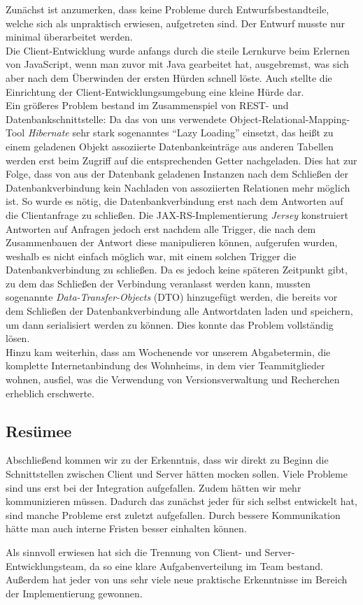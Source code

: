  Zunächst ist anzumerken, dass keine Probleme durch Entwurfsbestandteile, welche sich als unpraktisch erwiesen, aufgetreten sind. Der Entwurf musste nur minimal überarbeitet werden.\\
 Die Client-Entwicklung wurde anfangs durch die steile Lernkurve beim Erlernen von JavaScript, wenn man zuvor mit Java gearbeitet hat, ausgebremst, was sich aber nach dem Überwinden der ersten Hürden schnell löste. Auch stellte die Einrichtung der Client-Entwicklungsumgebung eine kleine Hürde dar.\\
 Ein größeres Problem bestand im Zusammenspiel von REST- und Datenbankschnittstelle: Da das von uns verwendete Object-Relational-Mapping-Tool \textit{Hibernate} sehr stark sogenanntes \enquote{Lazy Loading} einsetzt, das heißt zu einem geladenen Objekt assoziierte Datenbankeinträge aus anderen Tabellen werden erst beim Zugriff auf die entsprechenden Getter nachgeladen. Dies hat zur Folge, dass von aus der Datenbank geladenen Instanzen nach dem Schließen der Datenbankverbindung kein Nachladen von assoziierten Relationen mehr möglich ist. So wurde es nötig, die Datenbankverbindung erst nach dem Antworten auf die Clientanfrage zu schließen. Die JAX-RS-Implementierung \textit{Jersey} konstruiert Antworten auf Anfragen jedoch erst nachdem alle Trigger, die nach dem Zusammenbauen der Antwort diese manipulieren können, aufgerufen wurden, weshalb es nicht einfach möglich war, mit einem solchen Trigger die Datenbankverbindung zu schließen. Da es jedoch keine späteren Zeitpunkt gibt, zu dem das Schließen der Verbindung veranlasst werden kann, mussten sogenannte \textit{Data-Transfer-Objects} (DTO) hinzugefügt werden, die bereits vor dem Schließen der Datenbankverbindung alle Antwortdaten laden und speichern, um dann serialisiert werden zu können.
 Dies konnte das Problem vollständig lösen. \\
 Hinzu kam weiterhin, dass am Wochenende vor unserem Abgabetermin, die komplette Internetanbindung des Wohnheims, in dem vier Teammitglieder wohnen, ausfiel, was die Verwendung von Versionsverwaltung und Recherchen erheblich erschwerte. \\
 
 \subsection{Resümee}
 Abschließend kommen wir zu der Erkenntnis, dass wir direkt zu Beginn die Schnittstellen zwischen Client und Server hätten mocken sollen. Viele Probleme sind uns erst bei der Integration aufgefallen. Zudem hätten wir mehr kommunizieren müssen. Dadurch das zunächst jeder für sich selbst entwickelt hat, sind manche Probleme erst zuletzt aufgefallen. Durch bessere Kommunikation hätte man auch interne Fristen besser einhalten können.
 
 Als sinnvoll erwiesen hat sich die Trennung von Client- und Server-Entwicklungsteam, da so eine klare Aufgabenverteilung im Team bestand. Außerdem hat jeder von uns sehr viele neue praktische Erkenntnisse im Bereich der Implementierung gewonnen.
 
 